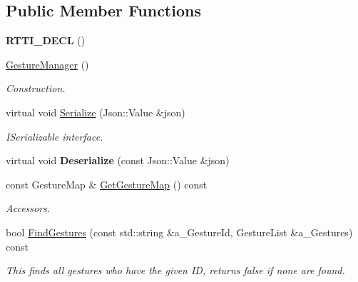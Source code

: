 \subsection*{Public Member Functions}
\begin{DoxyCompactItemize}
\item 
\mbox{\label{class_gesture_manager_a568a60a3f0763d9d26991a6da3abd8b9}} 
{\bfseries R\+T\+T\+I\+\_\+\+D\+E\+CL} ()
\item 
\mbox{\label{class_gesture_manager_a5ecfa8bb990c8b2064df5051848845a1}} 
\hyperlink{class_gesture_manager_a5ecfa8bb990c8b2064df5051848845a1}{Gesture\+Manager} ()
\begin{DoxyCompactList}\small\item\em Construction. \end{DoxyCompactList}\item 
\mbox{\label{class_gesture_manager_ad785801d982e5a8f1b943fe8d042ba27}} 
virtual void \hyperlink{class_gesture_manager_ad785801d982e5a8f1b943fe8d042ba27}{Serialize} (Json\+::\+Value \&json)
\begin{DoxyCompactList}\small\item\em I\+Serializable interface. \end{DoxyCompactList}\item 
\mbox{\label{class_gesture_manager_afafe002820cead44bead7c4dea9a16f7}} 
virtual void {\bfseries Deserialize} (const Json\+::\+Value \&json)
\item 
\mbox{\label{class_gesture_manager_a12fa31aabe615a3190e8eda374a11558}} 
const Gesture\+Map \& \hyperlink{class_gesture_manager_a12fa31aabe615a3190e8eda374a11558}{Get\+Gesture\+Map} () const
\begin{DoxyCompactList}\small\item\em Accessors. \end{DoxyCompactList}\item 
\mbox{\label{class_gesture_manager_af3d61e28375c7e0a38b4c4fa43138f7a}} 
bool \hyperlink{class_gesture_manager_af3d61e28375c7e0a38b4c4fa43138f7a}{Find\+Gestures} (const std\+::string \&a\+\_\+\+Gesture\+Id, Gesture\+List \&a\+\_\+\+Gestures) const
\begin{DoxyCompactList}\small\item\em This finds all gestures who have the given ID, returns false if none are found. \end{DoxyCompactList}\item 

\end{DoxyCompactItemize}
